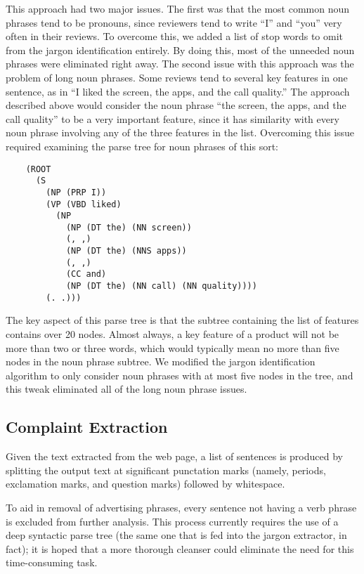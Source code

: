 \documentclass{article}
\begin{document}
This approach had two major issues.  The first was that the most common noun phrases tend to be pronouns, since reviewers tend to write ``I'' and ``you'' very often in their reviews.  To overcome this, we added a list of stop words to omit from the jargon identification entirely.  By doing this, most of the unneeded noun phrases were eliminated right away.  The second issue with this approach was the problem of long noun phrases.  Some reviews tend to several key features in one sentence, as in ``I liked the screen, the apps, and the call quality.''  The approach described above would consider the noun phrase ``the screen, the apps, and the call quality'' to be a very important feature, since it has similarity with every noun phrase involving any of the three features in the list.  Overcoming this issue required examining the parse tree for noun phrases of this sort: \begin{verbatim}
	(ROOT
	  (S
	    (NP (PRP I))
	    (VP (VBD liked)
	      (NP
	        (NP (DT the) (NN screen))
	        (, ,)
	        (NP (DT the) (NNS apps))
	        (, ,)
	        (CC and)
	        (NP (DT the) (NN call) (NN quality))))
	    (. .)))
\end{verbatim} The key aspect of this parse tree is that the subtree containing the list of features contains over 20 nodes.  Almost always, a key feature of a product will not be more than two or three words, which would typically mean no more than five nodes in the noun phrase subtree.  We modified the jargon identification algorithm to only consider noun phrases with at most five nodes in the tree, and this tweak eliminated all of the long noun phrase issues.


\subsection{Complaint Extraction} %

Given the text extracted from the web page, a list of sentences is produced by
splitting the output text at significant punctation marks (namely, periods,
exclamation marks, and question marks) followed by whitespace.

To aid in removal of advertising phrases, every sentence not having a verb
phrase is excluded from further analysis. This process currently requires the
use of a deep syntactic parse tree (the same one that is fed into the jargon
extractor, in fact); it is hoped that a more thorough cleanser could eliminate
the need for this time-consuming task.
\end{document}
